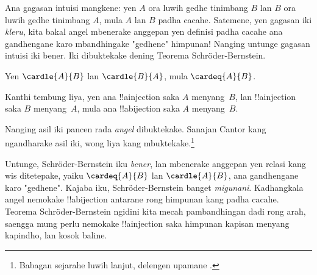 \documentclass[../../../include/open-logic-section]{subfiles}
\begin{document}


\begin{explain}
Ana gagasan intuisi mangkene: yen $A$ ora luwih gedhe tinimbang $B$ lan $B$
ora luwih gedhe tinimbang $A$, mula $A$ lan $B$ padha cacahe.
Satemene, yen gagasan iki \emph{kleru}, kita bakal angel mbenerake
anggepan yen definisi padha cacahe ana gandhengane karo mbandhingake
"gedhene" himpunan!{} Nanging untunge gagasan intuisi iki bener.
Iki dibuktekake dening Teorema Schr\"oder-Bernstein.
\end{explain}

\begin{thm}
	Yen $\cardle{A}{B}$ lan $\cardle{B}{A}$,
	mula $\cardeq{A}{B}$.
\end{thm}

\begin{explain}
Kanthi tembung liya, yen ana !!a{injection} saka $A$ menyang~$B$, lan
!!a{injection} saka $B$ menyang~$A$, mula ana !!a{bijection} saka $A$
menyang~$B$.

Nanging asil iki pancen rada \emph{angel} dibuktekake.
Sanajan Cantor kang ngandharake asil iki, wong liya kang
mbuktekake.\footnote{Babagan sejarahe luwih lanjut, delengen upamane
\citet[kaca~165--6]{Potter2004}.}

Untunge, Schr\"oder-Bernstein iku \emph{bener}, lan mbenerake anggepan
yen relasi kang wis ditetepake, yaiku $\cardeq{A}{B}$ lan $\cardle{A}{B}$,
ana gandhengane karo "gedhene". Kajaba iku, Schr\"oder-Bernstein
banget \emph{migunani}. Kadhangkala angel nemokake !!a{bijection}
antarane rong himpunan kang padha cacahe. Teorema Schr\"oder-Bernstein
ngidini kita mecah pambandhingan dadi rong arah, saengga mung perlu
nemokake !!a{injection} saka himpunan kapisan menyang kapindho,
lan kosok baline.
\end{explain}
\end{document}
